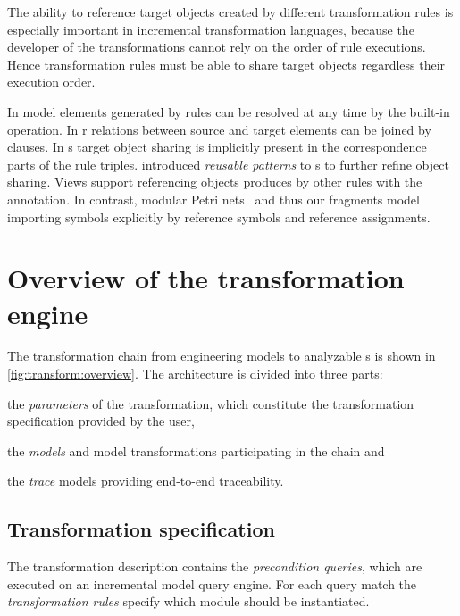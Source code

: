 The ability to reference target objects created by different transformation rules is especially important in incremental transformation languages, because the developer of the transformations cannot rely on the order of rule executions. Hence transformation rules must be able to share target objects regardless their execution order.

In  model elements generated by rules can be resolved at any time by the built-in  operation. In r relations between source and target elements can be joined by  clauses. In s target object sharing is implicitly present in the correspondence parts of the rule triples. \citet{Greenyer11advanced} introduced \emph{reusable patterns} to s to further refine object sharing.  Views support referencing objects produces by other rules with the  annotation. In contrast, modular Petri nets~\citep{Kindler09modular} and thus our  fragments model importing symbols explicitly by reference symbols and reference assignments.


\section{Overview of the transformation engine}
\label{chap:transfrom:specify}

The transformation chain from engineering models to analyzable s is shown in \vref{fig:transform:overview}. The architecture is divided into three parts: \begin{inparaenum}
\item the \emph{parameters} of the transformation, which constitute the transformation specification provided by the user,
\item the \emph{models} and model transformations participating in the chain and
\item the \emph{trace} models providing end-to-end traceability.
\end{inparaenum}

\subsection{Transformation specification}

The transformation description contains the \emph{precondition queries}, which are executed on an incremental model query engine. For each query match the \emph{transformation rules} specify which \emph{} module should be instantiated.

